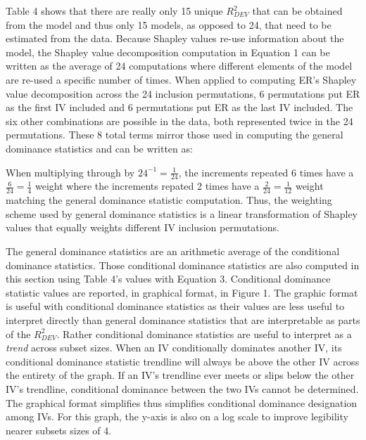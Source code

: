 \documentclass[ShortAfour,times,sageapa]{sagej}
\begin{document}
	Table 4 shows that there are really only 15 unique $R^2_{DEV}$ that can be obtained from the model and thus only 15 models, as opposed to 24, that need to be estimated from the data.
	Because Shapley values re-use information about the model, the Shapley value decomposition computation in Equation 1 can be written as the average of 24 computations where different elements of the model are re-used a specific number of times.
	When applied to computing ER's Shapley value decomposition across the 24 inclusion permutations, 6 permutations put ER as the first IV included and 6 permutations put ER as the last IV included.
	The six other combinations are possible in the data, both represented twice in the 24 permutations.
	These 8 total terms mirror those used in computing the general dominance statistics and can be written as:
	
	When multiplying through by $24^{-1} = \frac{1}{24}$, the increments repeated 6 times have a $\frac{6}{24} = \frac{1}{4}$ weight where the increments repated 2 times have a $\frac{2}{24} = \frac{1}{12}$ weight matching the general dominance statistic computation.
	Thus, the weighting scheme used by general dominance statistics is a linear transformation of Shapley values that equally weights different IV inclusion permutations.
	
	The general dominance statistics are an arithmetic average of the conditional dominance statistics.
	Those conditional dominance statistics are also computed in this section using Table 4's values with Equation 3. 
	Conditional dominance statistic values are reported, in graphical format, in Figure 1. 
	The graphic format is useful with conditional dominance statistics as their values are less useful to interpret directly than general dominance statistics that are interpretable as parts of the $R^2_{DEV}$.
	Rather conditional dominance statistics are useful to interpret as a \emph{trend} across subset sizes.
	When an IV conditionally dominates another IV, its conditional dominance statistic trendline will always be above the other IV across the entirety of the graph.
	If an IV's trendline ever meets or slips below the other IV's trendline, conditional dominance between the two IVs cannot be determined.
	The graphical format simplifies thus simplifies conditional dominance designation among IVs.
	For this graph, the y-axis is also on a log scale to improve legibility nearer subsets sizes of 4.
	
\end{document}
